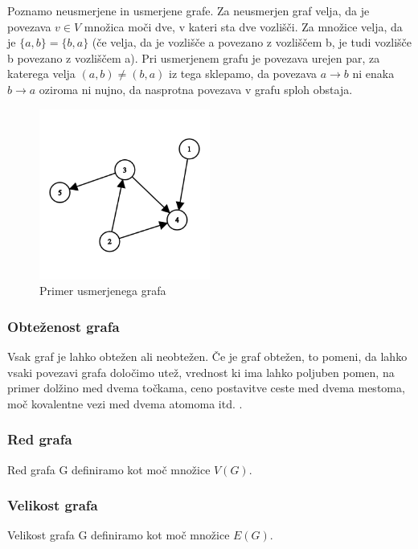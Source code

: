 \documentclass[11pt]{article}
\begin{document}
Poznamo neusmerjene in usmerjene grafe. Za neusmerjen graf velja, da je povezava $v \in V$ množica moči dve, v kateri sta dve vozlišči. Za množice velja, da je $\{a, b\} = \{b, a\}$ (če velja, da je vozlišče a povezano z vozliščem b, je tudi vozlišče b povezano z vozliščem a). Pri usmerjenem grafu je povezava urejen par, za katerega velja $(a, b) \neq (b, a)$ iz tega sklepamo, da povezava $a \rightarrow b$ ni enaka $b \rightarrow a$ oziroma ni nujno, da nasprotna povezava v grafu sploh obstaja.

\begin{figure}[H]
    \centering
    \includegraphics[width=0.5\textwidth]{directed_graph.png}
    \caption{Primer usmerjenega grafa}
    \label{fig:mesh1}
\end{figure}

\subsubsection{Obteženost grafa}

Vsak graf je lahko obtežen ali neobtežen. Če je graf obtežen, to pomeni, da lahko vsaki povezavi grafa določimo utež, vrednost ki ima lahko poljuben pomen, na primer dolžino med dvema točkama, ceno postavitve ceste med dvema mestoma, moč kovalentne vezi med dvema atomoma itd. . 

\subsubsection{Red grafa}

Red grafa G definiramo kot moč množice $V(G)$.

\subsubsection{Velikost grafa}

Velikost grafa G definiramo kot moč množice $E(G)$.
\end{document}
